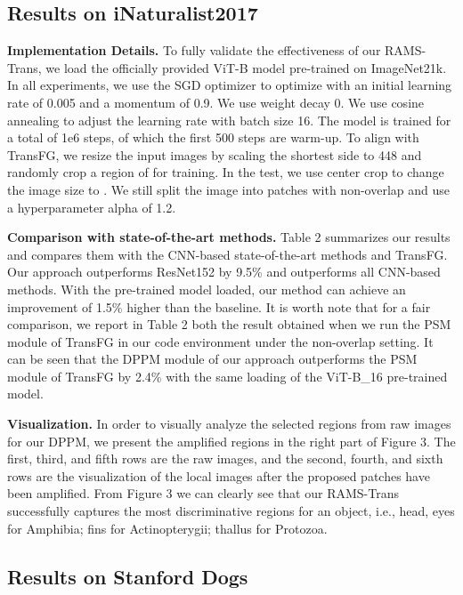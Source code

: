 \documentclass[sigconf]{acmart}
\begin{document}
\subsection{Results on iNaturalist2017}


\textbf{Implementation Details.} To fully validate the effectiveness of our RAMS-Trans, we load the officially provided ViT-B model pre-trained on ImageNet21k. In all experiments, we use the SGD optimizer to optimize with an initial learning rate of 0.005 and a momentum of 0.9. We use weight decay 0. We use cosine annealing to adjust the learning rate with batch size 16. The model is trained for a total of 1e6 steps, of which the first 500 steps are warm-up. To align with TransFG, we resize the input images by scaling the shortest side to 448 and randomly crop a region of  for training. In the test, we use center crop to change the image size to . We still split the image into  patches with non-overlap and use a hyperparameter alpha of 1.2.

\textbf{Comparison with state-of-the-art methods.} Table 2 summarizes our results and compares them with the CNN-based state-of-the-art methods and TransFG. Our approach outperforms ResNet152 by 9.5\% and outperforms all CNN-based methods. With the pre-trained model loaded, our method can achieve an improvement of 1.5\% higher than the baseline. It is worth note that for a fair comparison, we report in Table 2 both the result obtained when we run the PSM module of TransFG in our code environment under the non-overlap setting. It can be seen that the DPPM module of our approach outperforms the PSM module of TransFG by 2.4\% with the same loading of the ViT-B\_16 pre-trained model.

\textbf{Visualization.}
In order to visually analyze the selected regions from raw images for our DPPM, we present the amplified regions in the right part of Figure 3. The first, third, and fifth rows are the raw images, and the second, fourth, and sixth rows are the visualization of the local images after the proposed patches have been amplified. From Figure 3 we can clearly see that our RAMS-Trans successfully captures the most discriminative regions for an object, i.e., head, eyes for Amphibia; fins for Actinopterygii; thallus for Protozoa. 

\subsection{Results on Stanford Dogs}
\end{document}

